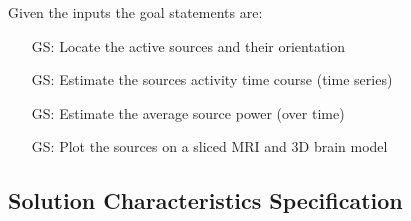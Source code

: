 \documentclass[12pt]{article}
\newcounter{goalnum} %
\begin{document}
\noindent Given the inputs the goal statements are:

\begin{itemize}

\item[GS\refstepcounter{goalnum}\thegoalnum \label{G_meaningfulLabel}:] Locate the active sources and their orientation
\item[GS\refstepcounter{goalnum}\thegoalnum \label{G_meaningfulLabel}:] Estimate the sources activity time course (time series)
\item[GS\refstepcounter{goalnum}\thegoalnum \label{G_meaningfulLabel}:] Estimate the average source power (over time)
\item[GS\refstepcounter{goalnum}\thegoalnum \label{G_meaningfulLabel}:] Plot the sources on a sliced MRI and 3D brain model 


%    
    

\end{itemize}

\subsection{Solution Characteristics Specification}
\end{document}
